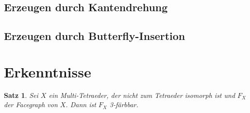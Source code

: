 \documentclass[12pt,titlepage,twoside,cleardoublepage]{article}
\theoremstyle{nummermitklammern}
\newtheorem{bemerkung}[temp]{Bemerkung}
\newtheorem{satz}[temp]{Satz}
\newtheorem{bemerkung}[zahl]{Bemerkung}
\newtheorem{satz}[zahl]{Satz}
\numberwithin{equation}{section}
\begin{document}
\subsection{Erzeugen durch Kantendrehung}
\subsection{Erzeugen durch Butterfly-Insertion}
\section{Erkenntnisse}
\begin{comment}
\begin{satz}
Sei $(X,<)$ eine vertex-treue  Sphäre und $e\in X_1$ eine Kante, die folgendes erfüllt 
\[
deg(V)=4 \forall V\in X_0(X_2(e)).
\]
 Dann ist $X \cong O$, wobei $(O,<_O)$ der bereits bekannte Oktaeder ist. 
\end{satz}
\begin{proof}
Für den Beweis nutzen wir die zuvor definierte Butterfly Deletion. Sei $X$ eine vertex-treue Sphäre mit obiger Eigenschaft. Dann bildet $Y=\textcolor{red}{e\beta(X)}$ eine simpliziale Fläche mit den Knoten $V,V',V''$ und Kanten $e',e''$, wobei
\begin{align*}
&deg(V)=4\\
&deg(V')=deg(V'')=3\\
&X_0(e')=\{V,V'\}\\
&X_0(e')=\{V,V''\}
\end{align*}
gilt.  Ein erneutes Anwenden der Butterfly Deletion liefert und die Sphäre $Z=\textcolor{red}{e\beta(Y)}$ mit $\bar{V}\in Z_0$ und $\bar{e}\in Z_1$, die $X_0(\bar{e})=\{\bar{V},V''\}$ erfüllen. Damit ist $Z\cong T$, da $\bar{V}$ und $V''$ benachbarte Knoten vom Grad $3$ sind.
Damit ist $Y$ isomorph zum Double-Tetraeder $DT$ und schlussendlich erhält man die obige Behauptung.
\end{proof}
\begin{bemerkung}
Falls bei der obigen Formulierung des Satzes auf die Voraussetzung der Vertex-Treue verzichtet wird, so ist die Aussage falsch. Denn die simpliziale Fläche, die dadurch entsteht, dass man sich eine beliebige Kante des Oktaeders nimmt, einen Cratercut an dieser durchführt und an den neu entstandenen Randkanten einen Open-Bag anheftet, erfüllt dann die Voraussetzung der schwächeren Umformulierung. Diese ist jedoch nicht zum Oktaeder isomorph.
\end{bemerkung}
\end{comment}
\begin{satz}
Sei $X$ ein Multi-Tetraeder, der nicht zum Tetraeder isomorph ist und $F_X$ der Facegraph von $X$. Dann ist $F_X$ 3-färbbar.
\end{satz}
\end{document}
